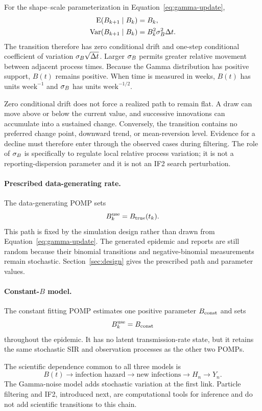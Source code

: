 For the shape--scale parameterization in
Equation~\ref{eq:gamma-update},
\begin{align}
\operatorname{E}(B_{k+1}\mid B_k)
&=B_k,\\
\operatorname{Var}(B_{k+1}\mid B_k)
&=B_k^2\sigma_B^2\Delta t.
\end{align}
The transition therefore has zero conditional drift and one-step conditional
coefficient of variation \(\sigma_B\sqrt{\Delta t}\).  Larger \(\sigma_B\) permits
greater relative movement between adjacent process times.  Because the Gamma
distribution has positive support, \(B(t)\) remains positive.  When time is
measured in weeks, \(B(t)\) has units \(\mathrm{week}^{-1}\) and \(\sigma_B\)
has units \(\mathrm{week}^{-1/2}\).

Zero conditional drift does not force a realized path to remain flat.  A draw
can move above or below the current value, and successive innovations can
accumulate into a sustained change.  Conversely, the transition contains no
preferred change point, downward trend, or mean-reversion level.  Evidence for
a decline must therefore enter through the observed cases during filtering.
The role of \(\sigma_B\) is specifically to regulate local relative process
variation; it is not a reporting-dispersion parameter and it is not an IF2
search perturbation.

\paragraph{Prescribed data-generating rate.}
The data-generating POMP sets
\[
B_k^{\mathrm{use}}=B_{\mathrm{true}}(t_k).
\]
This path is fixed by the simulation design rather than drawn from
Equation~\ref{eq:gamma-update}.  The generated epidemic and reports are still
random because their binomial transitions and negative-binomial measurements
remain stochastic.  Section~\ref{sec:design} gives the prescribed path and
parameter values.

\paragraph{Constant-\(B\) model.}
The constant fitting POMP estimates one positive parameter \(B_{\mathrm{const}}\) and
sets
\[
B_k^{\mathrm{use}}=B_{\mathrm{const}}
\]
throughout the epidemic.  It has no latent transmission-rate state, but it
retains the same stochastic SIR and observation processes as the other two
POMPs.

The scientific dependence common to all three models is
\[
B(t)
\longrightarrow
\text{infection hazard}
\longrightarrow
\text{new infections}
\longrightarrow
H_n
\longrightarrow
Y_n.
\]
The Gamma-noise model adds stochastic variation at the first link.  Particle
filtering and IF2, introduced next, are computational tools for inference and
do not add scientific transitions to this chain.

